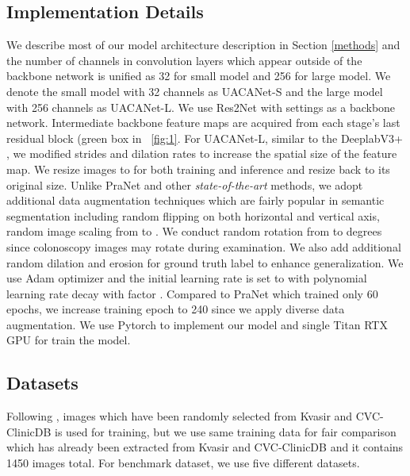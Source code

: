 \documentclass[sigconf]{acmart}
\begin{document}
\subsection{Implementation Details}

We describe most of our model architecture description in Section \ref{methods} and the number of channels in convolution layers which appear outside of the backbone network is unified as 32 for small model and 256 for large model. We denote the small model with 32 channels as UACANet-S and the large model with 256 channels as UACANet-L. We use Res2Net \cite{gao2019res2net} with  settings as a backbone network. Intermediate backbone feature maps are acquired from each stage's last residual block (green box in \figureautorefname~\ref{fig:1}. For UACANet-L, similar to the DeeplabV3+ \cite{chen2017rethinking}, we modified strides and dilation rates to increase the spatial size of the feature map. We resize images to  for both training and inference and resize back to its original size. Unlike PraNet \cite{fan2020pranet} and other \textit{state-of-the-art} methods, we adopt additional data augmentation techniques which are fairly popular in semantic segmentation including random flipping on both horizontal and vertical axis, random image scaling from  to . We conduct random rotation from  to  degrees since colonoscopy images may rotate during examination. We also add additional random dilation and erosion for ground truth label to enhance generalization. We use Adam optimizer \cite{kingma2014adam} and the initial learning rate is set to  with polynomial learning rate decay \cite{chen2017rethinking} with factor . Compared to PraNet which trained only 60 epochs, we increase training epoch to 240 since we apply diverse data augmentation. We use Pytorch \cite{paszke2019pytorch} to implement our model and single Titan RTX GPU for train the model.


\subsection{Datasets}

Following \cite{fan2020pranet}, images which have been randomly selected from Kvasir and CVC-ClinicDB is used for training, but we use same training data for fair comparison which has already been extracted from Kvasir and CVC-ClinicDB and it contains 1450 images total. For benchmark dataset, we use five different datasets.
\end{document}
